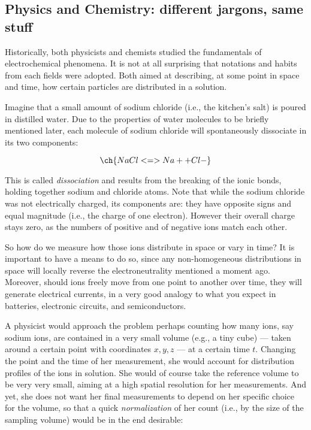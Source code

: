 \subsection{Physics and Chemistry: different jargons, same stuff}

Historically, both physicists and chemists studied the fundamentals of electrochemical phenomena. It is not at all surprising that notations and habits from each fields were adopted. Both aimed at describing, at some point in space and time, how certain particles are distributed in a solution. 

Imagine that a small amount of sodium chloride (i.e., the kitchen's salt) is poured in distilled water. Due to the properties of water molecules to be briefly mentioned later, each molecule of sodium chloride will spontaneously dissociate in its two components:

\[ \ch{NaCl  <=> Na +  + Cl- } \]

This is called \textit{dissociation} and results from the breaking of the ionic bonds, holding together sodium and chloride atoms. Note that while the sodium chloride was not electrically charged, its components are: they have opposite signs and equal magnitude (i.e., the charge of one electron). However their overall charge stays zero, as the numbers of positive and of negative ions match each other. 

So how do we measure how those ions distribute in space or vary in time? It is important to have a means to do so, since any non-homogeneous distributions in space will locally reverse the electroneutrality mentioned a moment ago. Moreover, should ions freely move from one point to another over time, they will generate electrical currents, in a very good analogy to what you expect in batteries, electronic circuits, and semiconductors. 

A physicist would approach the problem perhaps counting how many ions, say sodium ions, are contained in a very small volume (e.g., a tiny cube) --- taken around a certain point with coordinates \(x,y,z\) --- at a certain time \(t\). Changing the point and the time of her measurement, she would account for distribution profiles of the ions in solution. She would of course take the reference volume to be very very small, aiming at a high spatial resolution for her measurements. And yet, she does not want her final measurements to depend on her specific choice for the volume, so that a quick \textit{normalization} of her count (i.e., by the size of the sampling volume) would be in the end desirable:


